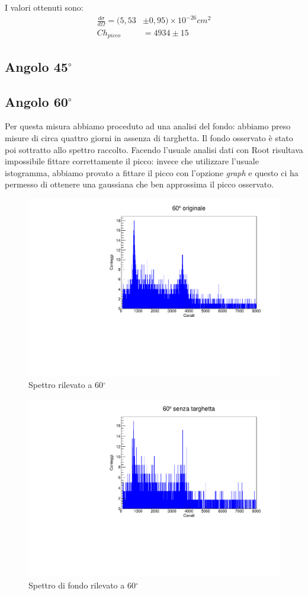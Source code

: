 \documentclass[italian,11pt]{report}
\begin{document}
\vspace{10cm}
I valori ottenuti sono:
\begin{align*}
\frac{d\sigma}{d\Omega} =(5,53&\pm0,95)\times10^{-26} cm^2 \\
Ch_{picco}&=4934\pm15
\end{align*}
\vspace{2cm}

\subsection{Angolo 45$^\circ$}

\newpage
\subsection{Angolo 60$^\circ$}
Per questa misura abbiamo proceduto ad una analisi del fondo: abbiamo preso misure di circa quattro giorni in assenza di targhetta. Il fondo osservato è stato poi sottratto allo spettro raccolto. Facendo l'usuale analisi dati con Root risultava impossibile fittare correttamente il picco: invece che utilizzare l'usuale istogramma, abbiamo provato a fittare il picco con l'opzione \textit{graph} e questo ci ha permesso di ottenere una gaussiana che ben approssima il picco osservato.
\begin{figure}[!htp]
\centering
\includegraphics[width=12cm]{60originale.pdf}
\caption{Spettro rilevato a 60$^\circ$}
\end{figure}
\begin{figure}[!htp]
\centering
\includegraphics[width=12cm]{60notarget.pdf}
\caption{Spettro di fondo rilevato a 60$^\circ$}
\end{figure}
\end{document}
